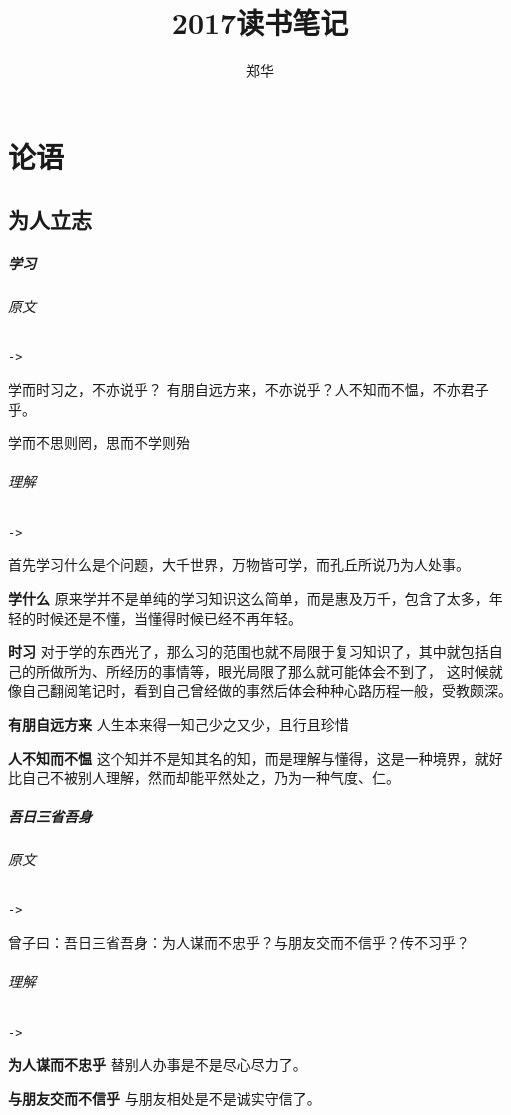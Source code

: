 \documentclass[UTF8,a4paper,8pt]{ctexbook}
\author{郑华}
\title{2017读书笔记}
\begin{document}
	\maketitle
	\tableofcontents
	

\chapter{论语}
	\section{为人立志}
		\paragraph{学习}
			\subparagraph{原文}\verb|->|
			
				学而时习之，不亦说乎？ 有朋自远方来，不亦说乎？人不知而不愠，不亦君子乎。
			
				学而不思则罔，思而不学则殆
				
			\subparagraph{理解}\verb|->|
			
				首先学习什么是个问题，大千世界，万物皆可学，而孔丘所说乃为人处事。
				
				\textbf{学什么} 原来学并不是单纯的学习知识这么简单，而是惠及万千，包含了太多，年轻的时候还是不懂，当懂得时候已经不再年轻。
				
				\textbf{时习} 对于学的东西光了，那么习的范围也就不局限于复习知识了，其中就包括自己的所做所为、所经历的事情等，眼光局限了那么就可能体会不到了， 这时候就像自己翻阅笔记时，看到自己曾经做的事然后体会种种心路历程一般，受教颇深。
				
				\textbf{有朋自远方来} 人生本来得一知己少之又少，且行且珍惜
				
				\textbf{人不知而不愠} 这个知并不是知其名的知，而是理解与懂得，这是一种境界，就好比自己不被别人理解，然而却能平然处之，乃为一种气度、仁。
		
		\paragraph{吾日三省吾身}
			\subparagraph{原文}\verb|->|
		
				曾子曰：吾日三省吾身：为人谋而不忠乎？与朋友交而不信乎？传不习乎？
			
			\subparagraph{理解}\verb|->|
			
				\textbf{为人谋而不忠乎} 替别人办事是不是尽心尽力了。
				
				\textbf{与朋友交而不信乎} 与朋友相处是不是诚实守信了。
				
\end{document}
